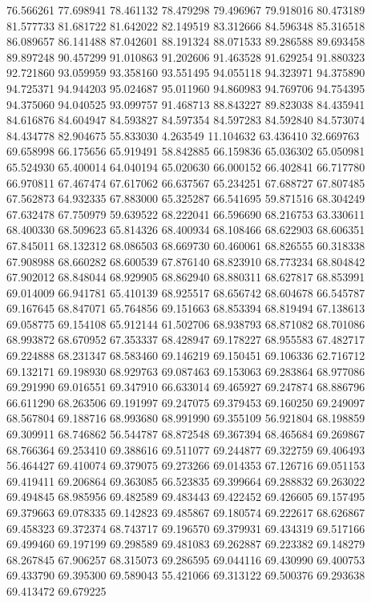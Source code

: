 76.566261
77.698941
78.461132
78.479298
79.496967
79.918016
80.473189
81.577733
81.681722
81.642022
82.149519
83.312666
84.596348
85.316518
86.089657
86.141488
87.042601
88.191324
88.071533
89.286588
89.693458
89.897248
90.457299
91.010863
91.202606
91.463528
91.629254
91.880323
92.721860
93.059959
93.358160
93.551495
94.055118
94.323971
94.375890
94.725371
94.944203
95.024687
95.011960
94.860983
94.769706
94.754395
94.375060
94.040525
93.099757
91.468713
88.843227
89.823038
84.435941
84.616876
84.604947
84.593827
84.597354
84.597283
84.592840
84.573074
84.434778
82.904675
55.833030
4.263549
11.104632
63.436410
32.669763
69.658998
66.175656
65.919491
58.842885
66.159836
65.036302
65.050981
65.524930
65.400014
64.040194
65.020630
66.000152
66.402841
66.717780
66.970811
67.467474
67.617062
66.637567
65.234251
67.688727
67.807485
67.562873
64.932335
67.883000
65.325287
66.541695
59.871516
68.304249
67.632478
67.750979
59.639522
68.222041
66.596690
68.216753
63.330611
68.400330
68.509623
65.814326
68.400934
68.108466
68.622903
68.606351
67.845011
68.132312
68.086503
68.669730
60.460061
68.826555
60.318338
67.908988
68.660282
68.600539
67.876140
68.823910
68.773234
68.804842
67.902012
68.848044
68.929905
68.862940
68.880311
68.627817
68.853991
69.014009
66.941781
65.410139
68.925517
68.656742
68.604678
66.545787
69.167645
68.847071
65.764856
69.151663
68.853394
68.819494
67.138613
69.058775
69.154108
65.912144
61.502706
68.938793
68.871082
68.701086
68.993872
68.670952
67.353337
68.428947
69.178227
68.955583
67.482717
69.224888
68.231347
68.583460
69.146219
69.150451
69.106336
62.716712
69.132171
69.198930
68.929763
69.087463
69.153063
69.283864
68.977086
69.291990
69.016551
69.347910
66.633014
69.465927
69.247874
68.886796
66.611290
68.263506
69.191997
69.247075
69.379453
69.160250
69.249097
68.567804
69.188716
68.993680
68.991990
69.355109
56.921804
68.198859
69.309911
68.746862
56.544787
68.872548
69.367394
68.465684
69.269867
68.766364
69.253410
69.388616
69.511077
69.244877
69.322759
69.406493
56.464427
69.410074
69.379075
69.273266
69.014353
67.126716
69.051153
69.419411
69.206864
69.363085
66.523835
69.399664
69.288832
69.263022
69.494845
68.985956
69.482589
69.483443
69.422452
69.426605
69.157495
69.379663
69.078335
69.142823
69.485867
69.180574
69.222617
68.626867
69.458323
69.372374
68.743717
69.196570
69.379931
69.434319
69.517166
69.499460
69.197199
69.298589
69.481083
69.262887
69.223382
69.148279
68.267845
67.906257
68.315073
69.286595
69.044116
69.430990
69.400753
69.433790
69.395300
69.589043
55.421066
69.313122
69.500376
69.293638
69.413472
69.679225
